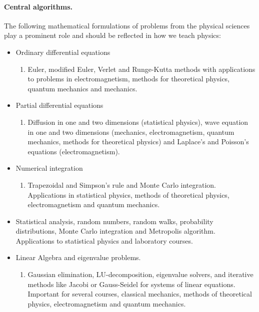 \paragraph{Central algorithms.}
The following mathematical formulations of problems from the physical sciences play a prominent role and should be reflected in how we teach physics:
\begin{itemize}
\item Ordinary differential equations
\begin{enumerate}

  \item Euler, modified Euler, Verlet and Runge-Kutta methods with applications to problems in electromagnetism, methods for theoretical physics, quantum mechanics and mechanics.

\end{enumerate}

\noindent
\item Partial differential equations
\begin{enumerate}

  \item Diffusion in one and two dimensions (statistical physics), wave equation in one and two dimensions (mechanics, electromagnetism, quantum mechanics, methods for theoretical physics) and Laplace's and Poisson's equations (electromagnetism).

\end{enumerate}

\noindent
\item Numerical integration
\begin{enumerate}

  \item Trapezoidal and Simpson's rule and Monte Carlo integration. Applications in statistical physics, methods of theoretical physics, electromagnetism and quantum mechanics.

\end{enumerate}

\noindent
\item Statistical analysis, random numbers, random walks, probability distributions, Monte Carlo integration and Metropolis algorithm. Applications to statistical physics and laboratory courses.

\item Linear Algebra and eigenvalue problems.
\begin{enumerate}

  \item Gaussian elimination, LU-decomposition, eigenvalue solvers, and iterative methods like  Jacobi or Gauss-Seidel for systems of linear equations. Important for several courses, classical mechanics, methods of theoretical physics, electromagnetism and quantum mechanics.


\end{enumerate}
\end{itemize}
